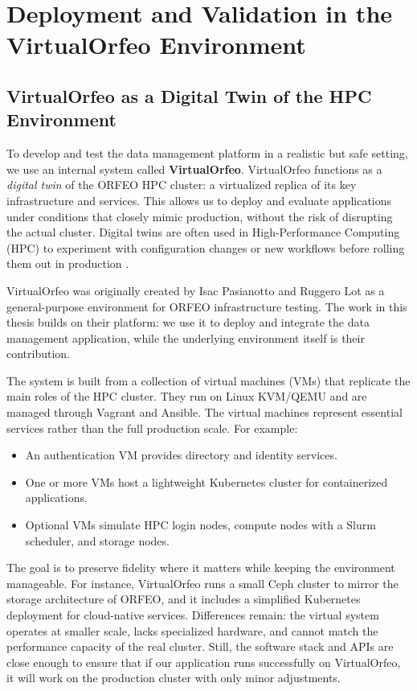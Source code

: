 \chapter{Deployment and Validation in the VirtualOrfeo Environment}\label{chap:virtualorfeo-deployment}

\section{VirtualOrfeo as a Digital Twin of the HPC Environment}

To develop and test the data management platform in a realistic but safe setting, we use an internal system called \textbf{VirtualOrfeo}. VirtualOrfeo functions as a \emph{digital twin} of the ORFEO HPC cluster: a virtualized replica of its key infrastructure and services. This allows us to deploy and evaluate applications under conditions that closely mimic production, without the risk of disrupting the actual cluster. Digital twins are often used in High-Performance Computing (HPC) to experiment with configuration changes or new workflows before rolling them out in production \parencite{Ohmura2023TwdsDT}.

VirtualOrfeo was originally created by Isac Pasianotto and Ruggero Lot as a general-purpose environment for ORFEO infrastructure testing. The work in this thesis builds on their platform: we use it to deploy and integrate the data management application, while the underlying environment itself is their contribution.

The system is built from a collection of virtual machines (VMs) that replicate the main roles of the HPC cluster. They run on Linux KVM/QEMU and are managed through Vagrant and Ansible. The virtual machines represent essential services rather than the full production scale. For example:  

\begin{itemize}
	\item An authentication VM provides directory and identity services.  
	\item One or more VMs host a lightweight Kubernetes cluster for containerized applications.  
	\item Optional VMs simulate HPC login nodes, compute nodes with a Slurm scheduler, and storage nodes.  
\end{itemize}

The goal is to preserve fidelity where it matters while keeping the environment manageable. For instance, VirtualOrfeo runs a small Ceph cluster to mirror the storage architecture of ORFEO, and it includes a simplified Kubernetes deployment for cloud-native services. Differences remain: the virtual system operates at smaller scale, lacks specialized hardware, and cannot match the performance capacity of the real cluster. Still, the software stack and APIs are close enough to ensure that if our application runs successfully on VirtualOrfeo, it will work on the production cluster with only minor adjustments.

